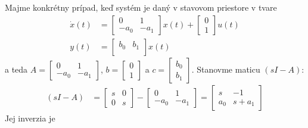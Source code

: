 \documentclass[a4paper, 10pt, ]{article}
\begin{document}
Majme konkrétny prípad, keď systém je daný v stavovom priestore v tvare
\begin{subequations}
    \begin{align}
        \dot x(t)
        &=
        \begin{bmatrix}
            0 & 1 \\
            - a_0 & - a_1
          \end{bmatrix}
        x(t)
        +
        \begin{bmatrix}
              0 \\
              1
         \end{bmatrix}
        u(t)
        \\
        y(t)
        &=
        \begin{bmatrix}
            b_0 & b_1 \\
        \end{bmatrix}
        x(t)
\end{align}
\end{subequations}
a teda $A = \begin{bmatrix} 0 & 1 \\ - a_0 & - a_1 \end{bmatrix}$, $b = \begin{bmatrix} 0 \\ 1 \end{bmatrix}$ a $c = \begin{bmatrix} b_0 \\ b_1 \end{bmatrix}$. Stanovme maticu $(s I - A)$:
\begin{align}
    (s I - A) &=
    \begin{bmatrix}
        s & 0 \\
        0 & s
    \end{bmatrix}
    -
    \begin{bmatrix}
        0 & 1 \\
        - a_0 & - a_1
    \end{bmatrix}
    =
    \begin{bmatrix}
        s & -1 \\
        a_0 & s + a_1
    \end{bmatrix}
\end{align}
Jej inverzia je
\end{document}
